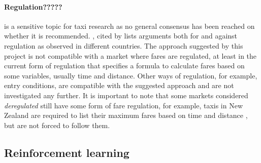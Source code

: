 \paragraph{Regulation?????} is a sensitive topic for taxi research as no general consensus has been reached on whether it is recommended. \textcite{Oecd2007taxi+policy}, cited by \parencite{Salanova2011taxi+review} lists arguments both for and against regulation as observed in different countries. The approach suggested by this project is not compatible with a market where fares are regulated, at least in the current form of regulation that specifies a formula to calculate fares based on some variables, usually time and distance. Other ways of regulation, for example, entry conditions, are compatible with the suggested approach and are not investigated any further. It is important to note that some markets considered \textit{deregulated} still have some form of fare regulation, for example, taxis in New Zealand are required to list their maximum fares based on time and distance \parencite{Gaunt1995taxi+newzealand}, but are not forced to follow them.

\subsection{Reinforcement learning}